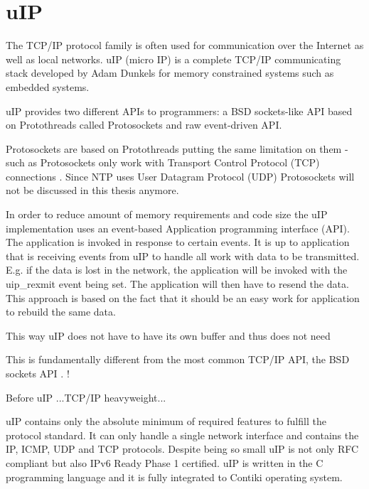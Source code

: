 \section{uIP}\label{sec:contiki-uip}
The TCP/IP protocol family is often used for communication over the Internet as well as local networks.
uIP (micro IP) is a complete TCP/IP communicating stack developed by Adam Dunkels for memory constrained systems such as embedded systems.


uIP provides two different APIs to programmers: a BSD sockets-like API based on Protothreads called Protosockets
and raw event-driven API.

Protosockets are based on Protothreads putting the same limitation on them - such as 
\!
Protosockets only work with Transport Control Protocol (TCP) connections \cite{contiki-docs}.
Since NTP uses User Datagram Protocol (UDP) Protosockets will not be
discussed in this thesis anymore.

In order to reduce amount of memory requirements and code size the
uIP implementation uses an event-based Application programming interface (API).
The application is invoked in response to certain events.
It is up to application that is receiving events from uIP to handle all
work with data to be transmitted. E.g. if the data is lost in the network,
the application will be invoked with the uip\_rexmit event being set.
The application will then have to resend the data.
This approach is based on the fact that it should be an easy work for application
to rebuild the same data.

\!This way uIP does not have to have its own buffer and thus
does not need


This is fundamentally different from the most common TCP/IP API, the BSD sockets API \cite{thesis-programming}.
\!!


Before uIP ...TCP/IP heavyweight...

uIP contains only the absolute minimum of required features to fulfill the protocol standard.
It can only handle a single network interface and contains the IP, ICMP, UDP and TCP protocols.
Despite being so small uIP is not only RFC compliant but also IPv6 Ready Phase 1 certified.
uIP is written in the C programming language and it is fully integrated to Contiki operating system.
